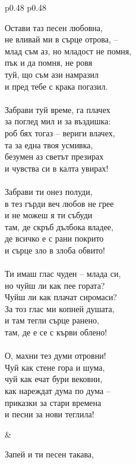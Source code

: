 \documentclass[12pt,a4paper]{article}
\begin{document}
\begin{tabular}{p{0.48\textwidth} p{0.48\textwidth}}
\begin{minipage}[t]{\linewidth}
Остави таз песен любовна,\\
не вливай ми в сърце отрова, –\\
млад съм аз, но младост не помня,\\
пък и да помня, не ровя\\
туй, що съм ази намразил\\
и пред тебе с крака погазил.\\
\\
Забрави туй време, га плачех\\
за поглед мил и за въздишка:\\
роб бях тогаз – вериги влачех,\\
та за една твоя усмивка,\\
безумен аз светът презирах\\
и чувства си в калта увирах!\\
\\
Забрави ти онез полуди,\\
в тез гърди веч любов не грее\\
и не можеш я ти събуди\\
там, де скръб дълбока владее,\\
де всичко е с рани покрито\\
и сърце зло в злоба обвито!\\
\\
Ти имаш глас чуден – млада си,\\
но чуйш ли как пее гората?\\
Чуйш ли как плачат сиромаси?\\
За тоз глас ми копней душата,\\
и там тегли сърце ранено,\\
там, де е се с кърви облено!\\
\\
О, махни тез думи отровни!\\
Чуй как стене гора и шума,\\
чуй как ечат бури вековни,\\
как нареждат дума по дума –\\
приказки за стари времена\\
и песни за нови теглила!\\
\end{minipage}
&
\begin{minipage}[t]{\linewidth}
Запей и ти песен такава,\\

\end{minipage}
\end{tabular}
\end{document}
